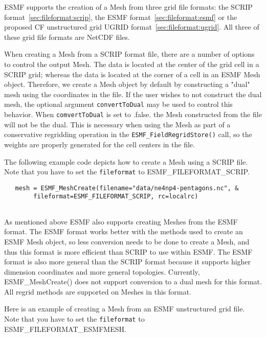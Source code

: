    ESMF supports the creation of a Mesh from three grid file formats: the SCRIP format~\ref{sec:fileformat:scrip}, the 
   ESMF format~\ref{sec:fileformat:esmf} or the
   proposed CF unstructured grid UGRID format~\ref{sec:fileformat:ugrid}.  All three of these grid file formats
   are NetCDF files. 
   
   When creating a Mesh from a SCRIP format file, there are a number of options to control the output Mesh.
   The data is located at the center of the grid cell in a SCRIP grid; whereas
   the data is located at the corner of a cell in an ESMF Mesh object.  Therefore,
   we create a Mesh object by default by constructing a "dual" mesh using the coordinates in the file. 
   If the user wishes to not construct the dual mesh, the optional argument {\tt convertToDual} may be 
   used to control this behavior. When {\tt comvertToDual} is 
   set to .false. the Mesh constructed from the file will not be the dual. This is necessary when using the 
   Mesh as part of a conservative regridding operation in the {\tt ESMF\_FieldRegridStore()} call, so the
   weights are properly generated for the cell centers in the file. 
  
   The following example code depicts how to create a Mesh using a SCRIP file. Note that
   you have to set the {\tt fileformat} to ESMF\_FILEFORMAT\_SCRIP.   

 \begin{verbatim}
   mesh = ESMF_MeshCreate(filename="data/ne4np4-pentagons.nc", &
        fileformat=ESMF_FILEFORMAT_SCRIP, rc=localrc)
 
\end{verbatim}
 

   As mentioned above ESMF also supports creating Meshes from the ESMF format.
   The ESMF format works better with the methods used to create an ESMF Mesh object, so less conversion needs 
   to be done to create a Mesh, and thus this format is more efficient than SCRIP to use within ESMF. 
   The ESMF format is also more general than the SCRIP format because it supports higher dimension coordinates and more general
   topologies.  Currently, ESMF\_MeshCreate() does not support conversion to a dual mesh for this format. All regrid methods
   are supported on Meshes in this format. 
  
   Here is an example of creating a Mesh from an ESMF unstructured grid file. Note that you have to set the {\tt fileformat} to
   ESMF\_FILEFORMAT\_ESMFMESH.   

